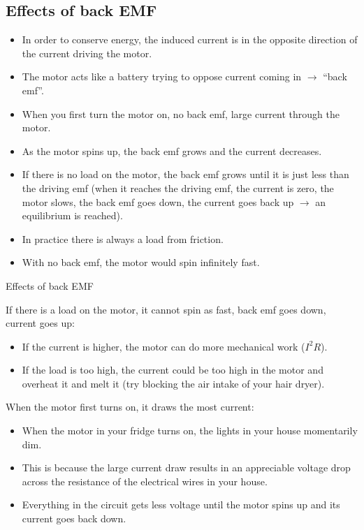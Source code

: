 \documentclass[aspectratio=169,
hyperref={colorlinks,urlcolor=blue}
]{beamer}
\begin{document}
\subsection{Effects of back EMF}
\label{subsec:effectsofbackemf}
{\scriptsize
\begin{itemize}
\item In order to conserve energy, the induced current is in the opposite direction of the current driving the motor.
\item The motor acts like a battery trying to oppose current coming in $\rightarrow$ ``back emf''.
\item When you first turn the motor on, no back emf, large current through the motor.
\item As the motor spins up, the back emf grows and the current decreases.
\item If there is no load on the motor, the back emf grows until it is just less than the driving emf (when it reaches the driving emf, the current is zero, the motor slows, the back emf goes down, the current goes back up $\rightarrow$ an equilibrium is reached).
\item In practice there is always a load from friction.
\item With no back emf, the motor would spin infinitely fast.
\end{itemize}
}
{
}

\begin{bulletframe}{Effects of back EMF}
\item If there is a load on the motor, it cannot spin as fast, back emf goes down, current goes up:
\begin{itemize}
\item If the current is higher, the motor can do more mechanical work ($I^2R$).
\item If the load is too high, the current could be too high in the motor and overheat it and melt it (try blocking the air intake of your hair dryer).
\end{itemize}
\item When the motor first turns on, it draws the most current:
\begin{itemize}
\item When the motor in your fridge turns on, the lights in your house momentarily dim.
\item This is because the large current draw results in an appreciable voltage drop across the resistance of the electrical wires in your house.
\item Everything in the circuit gets less voltage until the motor spins up and its current goes back down.
\end{itemize}
\end{bulletframe}
\end{document}
